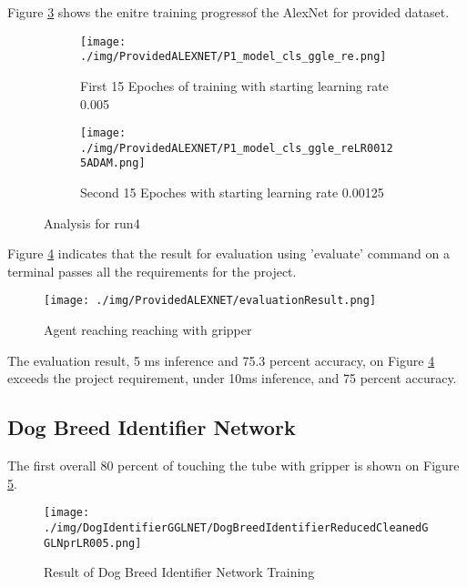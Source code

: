 \documentclass[10pt,journal,compsoc]{IEEEtran}
\begin{document}
Figure \ref{fig:Udacity30Epoch} shows the enitre training progressof the AlexNet for provided dataset.
\begin{figure}
	\begin{subfigure}{0.235\textwidth}
            \centering
            \texttt{[image: ./img/ProvidedALEXNET/P1\_model\_cls\_ggle\_re.png]}
            \caption{First 15 Epoches of training with starting learning rate 0.005}
            \label{fig:UdacityFirst15Epoch}
      \end{subfigure}%
	\begin{subfigure}{0.235\textwidth}
            \texttt{[image: ./img/ProvidedALEXNET/P1\_model\_cls\_ggle\_reLR00125ADAM.png]}
            \caption{Second 15 Epoches with starting learning rate 0.00125}
            \label{fig:UdacitySecond15Epoch}
      \end{subfigure}
      
	\caption{Analysis for run4}
	\label{fig:Udacity30Epoch}
 \end{figure}
Figure \ref{fig:UdacityEvaluationResult} indicates that the result for evaluation using 'evaluate' command on a terminal passes all the requirements for the project.
\begin{figure}[thpb]
      \centering
      \texttt{[image: ./img/ProvidedALEXNET/evaluationResult.png]}
      \caption{Agent reaching reaching with gripper}
      \label{fig:UdacityEvaluationResult}
\end{figure}
The evaluation result, 5 ms inference and 75.3 percent accuracy, on Figure \ref{fig:UdacityEvaluationResult} exceeds the project requirement, under 10ms inference, and 75 percent accuracy.

\subsection{Dog Breed Identifier Network}

The first overall 80 percent of touching the tube with gripper is shown on Figure \ref{fig:DogIdentifierGGLNET}.
\begin{figure}[thpb]
      \centering
      \texttt{[image: ./img/DogIdentifierGGLNET/DogBreedIdentifierReducedCleanedGGLNprLR005.png]}
      \caption{Result of Dog Breed Identifier Network Training}
      \label{fig:DogIdentifierGGLNET}
\end{figure}
\end{document}
